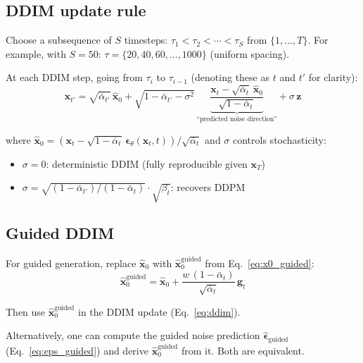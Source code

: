 \documentclass[11pt]{article}
\newcommand{\xb}{\mathbf{x}}
\newcommand{\zb}{\mathbf{z}}
\newcommand{\eb}{\boldsymbol{\epsilon}}
\newcommand{\gb}{\mathbf{g}}
\newcommand{\alphabar}{\bar{\alpha}}
\begin{document}
\subsection{DDIM update rule}

Choose a subsequence of $S$ timesteps: $\tau_1 < \tau_2 < \cdots < \tau_S$ from $\{1, \ldots, T\}$.
For example, with $S = 50$: $\tau = \{20, 40, 60, \ldots, 1000\}$ (uniform spacing).

At each DDIM step, going from $\tau_i$ to $\tau_{i-1}$ (denoting these as $t$ and $t'$ for clarity):
\begin{equation}
    \xb_{t'} = \sqrt{\alphabar_{t'}}\, \hat{\xb}_0
    + \sqrt{1 - \alphabar_{t'} - \sigma^2}\,
    \underbrace{\frac{\xb_t - \sqrt{\alphabar_t}\, \hat{\xb}_0}{\sqrt{1 - \alphabar_t}}}_{\text{``predicted noise direction''}}
    + \sigma\, \zb
    \label{eq:ddim}
\end{equation}

where $\hat{\xb}_0 = (\xb_t - \sqrt{1-\alphabar_t}\,\eb_\theta(\xb_t, t)) / \sqrt{\alphabar_t}$
and $\sigma$ controls stochasticity:
\begin{itemize}[nosep]
    \item $\sigma = 0$: deterministic DDIM (fully reproducible given $\xb_T$)
    \item $\sigma = \sqrt{(1-\alphabar_{t'})/(1-\alphabar_t)} \cdot \sqrt{\beta_t}$: recovers DDPM
\end{itemize}

\subsection{Guided DDIM}

For guided generation, replace $\hat{\xb}_0$ with $\hat{\xb}_0^{\text{guided}}$ from
Eq.~\eqref{eq:x0_guided}:
\begin{equation}
    \hat{\xb}_0^{\text{guided}}
    = \hat{\xb}_0 + \frac{w\,(1-\alphabar_t)}{\sqrt{\alphabar_t}}\, \gb_t
\end{equation}

Then use $\hat{\xb}_0^{\text{guided}}$ in the DDIM update (Eq.~\eqref{eq:ddim}).

Alternatively, one can compute the guided noise prediction $\hat{\eb}_{\text{guided}}$
(Eq.~\eqref{eq:eps_guided}) and derive $\hat{\xb}_0^{\text{guided}}$ from it. Both are equivalent.
\end{document}
